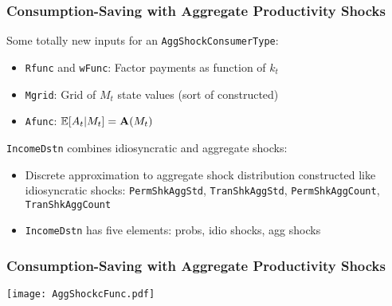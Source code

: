 \documentclass[11ptt]{beamer}
\begin{document}
\begin{frame}
  \frametitle{Consumption-Saving with Aggregate Productivity Shocks}
  Some totally new inputs for an \texttt{AggShockConsumerType}:
  \begin{itemize}
  \item \texttt{Rfunc} and \texttt{wFunc}: Factor payments as function of $k_t$

  \item \texttt{Mgrid}: Grid of $M_t$ state values (sort of constructed)

  \item \texttt{Afunc}: $\mathbb{E}[A_t | M_t] = \mathbf{A}(M_t)$
  \end{itemize}

  \texttt{IncomeDstn} combines idiosyncratic and aggregate shocks:
  \begin{itemize}
  \item Discrete approximation to aggregate shock distribution constructed like idiosyncratic shocks: \texttt{PermShkAggStd}, \texttt{TranShkAggStd}, \texttt{PermShkAggCount}, \texttt{TranShkAggCount}

  \item \texttt{IncomeDstn} has five elements: probs, idio shocks, agg shocks
  \end{itemize}
\end{frame}

\begin{frame}
  \frametitle{Consumption-Saving with Aggregate Productivity Shocks}
  \begin{center}
    \texttt{[image: AggShockcFunc.pdf]}
  \end{center}
\end{frame}
\end{document}
